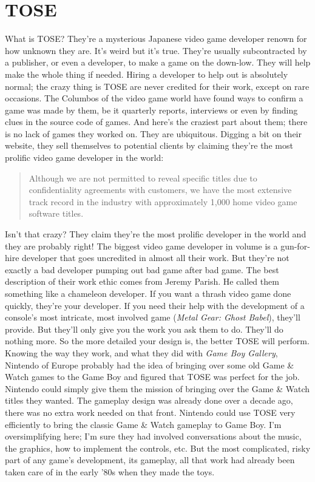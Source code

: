 \documentclass{book}
\begin{document}
\FloatBarrier\section*{TOSE}
What is TOSE? They’re a mysterious Japanese video game developer renown for how unknown they are. It’s weird but it’s true. They’re usually subcontracted by a publisher, or even a developer, to make a game on the down-low. They will help make the whole thing if needed. Hiring a developer to help out is absolutely normal; the crazy thing is TOSE are never credited for their work, except on rare occasions. The Columbos of the video game world have found ways to confirm a game was made by them, be it quarterly reports, interviews or even by finding clues in the source code of games. And here’s the craziest part about them; there is no lack of games they worked on. They are ubiquitous. Digging a bit on their website, they sell themselves to potential clients by claiming they’re the most prolific video game developer in the world:\par
\begin{quote}
Although we are not permitted to reveal specific titles due to confidentiality agreements with customers, we have the most extensive track record in the industry with approximately 1,000 home video game software titles.\par
\end{quote} \par
Isn’t that crazy? They claim they’re the most prolific developer in the world and they are probably right! The biggest video game developer in volume is a gun-for-hire developer that goes uncredited in almost all their work. But they’re not exactly a bad developer pumping out bad game after bad game. The best description of their work ethic comes from Jeremy Parish. He called them something like a chameleon developer. If you want a thrash video game done quickly, they’re your developer. If you need their help with the development of a console’s most intricate, most involved game (\emph{Metal Gear: Ghost Babel}), they’ll provide. But they’ll only give you the work you ask them to do. They’ll do nothing more. So the more detailed your design is, the better TOSE will perform. Knowing the way they work, and what they did with \emph{Game Boy Gallery}, Nintendo of Europe probably had the idea of bringing over some old Game \& Watch games to the Game Boy and figured that TOSE was perfect for the job. Nintendo could simply give them the mission of bringing over the Game \& Watch titles they wanted. The gameplay design was already done over a decade ago, there was no extra work needed on that front. Nintendo could use TOSE very efficiently to bring the classic Game \& Watch gameplay to Game Boy. I’m oversimplifying here; I’m sure they had involved conversations about the music, the graphics, how to implement the controls, etc. But the most complicated, risky part of any game’s development, its gameplay, all that work had already been taken care of in the early ’80s when they made the toys.\par
\end{document}
